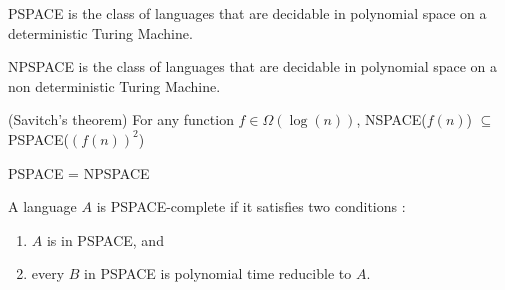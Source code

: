 \begin{defn}
PSPACE is the class of languages that are decidable in polynomial space on a deterministic Turing Machine.
\end{defn}

\begin{defn}
NPSPACE is the class of languages that are decidable in polynomial space on a non deterministic Turing Machine.
\end{defn}

\begin{theorem}(Savitch's theorem) 
For any function $f \in \Omega(\log(n))$, NSPACE($f(n)$) $\subseteq$ PSPACE($(f(n))^2$)
\end{theorem}
\begin{corollary}
PSPACE = NPSPACE
\end{corollary}

\begin{defn}
A language $A$ is PSPACE-complete if it satisfies two conditions : 
\begin{enumerate}
    \item $A$ is in PSPACE, and 
    \item every $B$ in PSPACE is polynomial time reducible to $A$.
\end{enumerate}
\end{defn}